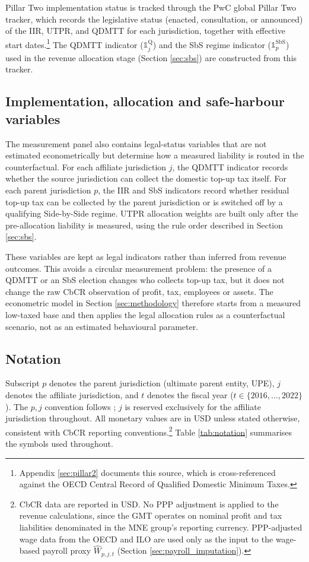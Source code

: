 \documentclass[11pt,a4paper]{article}
\begin{document}
Pillar Two implementation status is tracked through the PwC global Pillar Two tracker, which records the legislative status (enacted, consultation, or announced) of the IIR, UTPR, and QDMTT for each jurisdiction, together with effective start dates.\footnote{Appendix \ref{sec:pillar2} documents this source, which is cross-referenced against the OECD Central Record of Qualified Domestic Minimum Taxes.} The QDMTT indicator ($\mathbb{1}_j^{\text{Q}}$) and the SbS regime indicator ($\mathbb{1}_p^{\text{SbS}}$) used in the revenue allocation stage (Section \ref{sec:sbs}) are constructed from this tracker.

\subsection{Implementation, allocation and safe-harbour variables}\label{sec:implementation_variables}

The measurement panel also contains legal-status variables that are not estimated econometrically but determine how a measured liability is routed in the counterfactual. For each affiliate jurisdiction $j$, the QDMTT indicator records whether the source jurisdiction can collect the domestic top-up tax itself. For each parent jurisdiction $p$, the IIR and SbS indicators record whether residual top-up tax can be collected by the parent jurisdiction or is switched off by a qualifying Side-by-Side regime. UTPR allocation weights are built only after the pre-allocation liability is measured, using the rule order described in Section \ref{sec:sbs}.

These variables are kept as legal indicators rather than inferred from revenue outcomes. This avoids a circular measurement problem: the presence of a QDMTT or an SbS election changes who collects top-up tax, but it does not change the raw CbCR observation of profit, tax, employees or assets. The econometric model in Section \ref{sec:methodology} therefore starts from a measured low-taxed base and then applies the legal allocation rules as a counterfactual scenario, not as an estimated behavioural parameter.

\subsection{Notation}\label{sec:notation}

Subscript $p$ denotes the parent jurisdiction (ultimate parent entity, UPE), $j$ denotes the affiliate jurisdiction, and $t$ denotes the fiscal year ($t \in \{2016, \ldots, 2022\}$). The $p,j$ convention follows \citet{barake2022}; $j$ is reserved exclusively for the affiliate jurisdiction throughout. All monetary values are in USD unless stated otherwise, consistent with CbCR reporting conventions.\footnote{CbCR data are reported in USD. No PPP adjustment is applied to the revenue calculations, since the GMT operates on nominal profit and tax liabilities denominated in the MNE group's reporting currency. PPP-adjusted wage data from the OECD and ILO are used only as the input to the wage-based payroll proxy $\hat{W}_{p,j,t}$ (Section \ref{sec:payroll_imputation}).} Table \ref{tab:notation} summarises the symbols used throughout.
\end{document}
